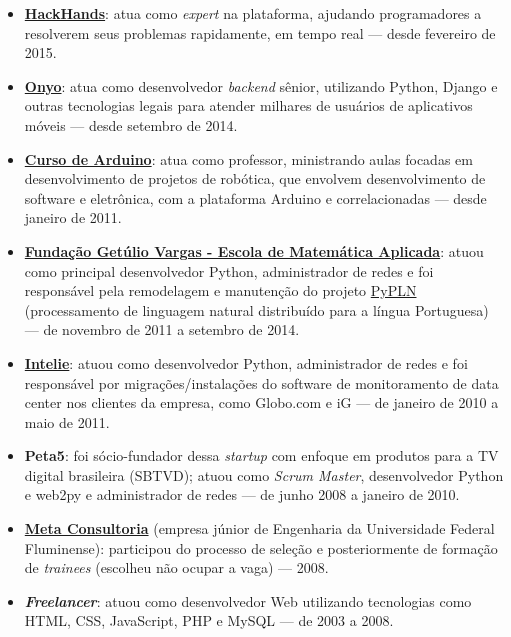 \documentclass[a4paper,11pt]{article}
\begin{document}
	\begin{itemize}
		\item \href{http://hackhands.com}{\textbf{HackHands}}: atua como
			\textit{expert} na plataforma, ajudando programadores a resolverem
			seus problemas rapidamente, em tempo real --- desde fevereiro de
			2015.
		\item \href{http://onyo.com}{\textbf{Onyo}}: atua como desenvolvedor
			\textit{backend} sênior, utilizando Python, Django e outras
			tecnologias legais para atender milhares de usuários de aplicativos
			móveis --- desde setembro de 2014.
		\item \href{http://www.cursodearduino.com.br/}{\textbf{Curso de
			Arduino}}: atua como professor, ministrando aulas focadas em
			desenvolvimento de projetos de robótica, que envolvem
			desenvolvimento de software e eletrônica, com a plataforma Arduino
			e correlacionadas --- desde janeiro de 2011.
		\item \href{http://emap.fgv.br/}{\textbf{Fundação Getúlio Vargas -
			Escola de Matemática Aplicada}}: atuou como principal desenvolvedor
			Python, administrador de redes e foi responsável pela remodelagem e
			manutenção do projeto \href{http://pypln.org/}{PyPLN}
			(processamento de linguagem natural distribuído para a língua
			Portuguesa) --- de novembro de 2011 a setembro de 2014.
		\item \href{http://www.intelie.com.br/}{\textbf{Intelie}}: atuou como
			desenvolvedor Python, administrador de redes e foi responsável por
			migrações/instalações do software de monitoramento de data center
			nos clientes da empresa, como Globo.com e iG --- de janeiro de 2010
			a maio de 2011.
		\item \textbf{Peta5}: foi sócio-fundador dessa \textit{startup} com
			enfoque em produtos para a TV digital brasileira (SBTVD); atuou
			como \textit{Scrum Master}, desenvolvedor Python e web2py e
			administrador de redes --- de junho 2008 a janeiro de 2010.
		\item \href{http://www.metaconsultoria.com/}{\textbf{Meta Consultoria}}
			(empresa júnior de Engenharia da Universidade Federal Fluminense):
			participou do processo de seleção e posteriormente de formação de
			\textit{trainees} (escolheu não ocupar a vaga) --- 2008.
		\item \textbf{\textit{Freelancer}}: atuou como desenvolvedor Web
			utilizando tecnologias como HTML, CSS, JavaScript, PHP e MySQL ---
			de 2003 a 2008.
	\end{itemize}
\end{document}
